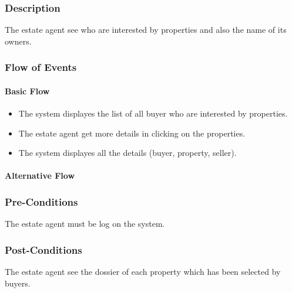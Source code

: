 \documentclass[a4paper,12pt]{article}
\begin{document}
\subsubsection{Description}
The estate agent see who are interested by properties and also the name of its owners.
\subsubsection{Flow of Events}
\paragraph{Basic Flow}
\begin{itemize}
\item The system displayes the list of all buyer who are interested by properties.
\item The estate agent get more details in clicking on the properties.
\item The system displayes all the details (buyer, property, seller).
\end{itemize}
\paragraph{Alternative Flow}
\begin{itemize}
\end{itemize}
\subsubsection{Pre-Conditions}
The estate agent must be log on the system.
\subsubsection{Post-Conditions}
The estate agent see the dossier of each property which has been selected by buyers.
\end{document}
